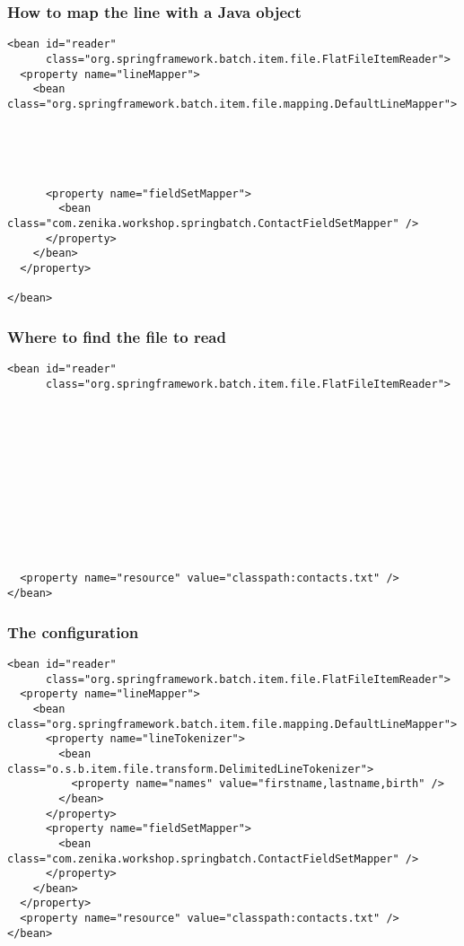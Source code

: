\begin{frame}[fragile]
 \frametitle{How to map the line with a Java object}


\lstset{language=XML}
\begin{lstlisting}
<bean id="reader"
      class="org.springframework.batch.item.file.FlatFileItemReader">
  <property name="lineMapper">
    <bean class="org.springframework.batch.item.file.mapping.DefaultLineMapper">





      <property name="fieldSetMapper">
        <bean class="com.zenika.workshop.springbatch.ContactFieldSetMapper" />
      </property>
    </bean>
  </property>

</bean>
\end{lstlisting}

\end{frame}

\begin{frame}[fragile]
 \frametitle{Where to find the file to read}

\lstset{language=XML}
\begin{lstlisting}
<bean id="reader"
      class="org.springframework.batch.item.file.FlatFileItemReader">












  <property name="resource" value="classpath:contacts.txt" />
</bean>
\end{lstlisting}

\end{frame}

\begin{frame}[fragile]
 \frametitle{The  configuration}

\lstset{language=XML}
\begin{lstlisting}
<bean id="reader"
      class="org.springframework.batch.item.file.FlatFileItemReader">
  <property name="lineMapper">
    <bean class="org.springframework.batch.item.file.mapping.DefaultLineMapper">
      <property name="lineTokenizer">
        <bean class="o.s.b.item.file.transform.DelimitedLineTokenizer">
          <property name="names" value="firstname,lastname,birth" />
        </bean>
      </property>
      <property name="fieldSetMapper">
        <bean class="com.zenika.workshop.springbatch.ContactFieldSetMapper" />
      </property>
    </bean>
  </property>
  <property name="resource" value="classpath:contacts.txt" />
</bean>
\end{lstlisting}

\end{frame}

